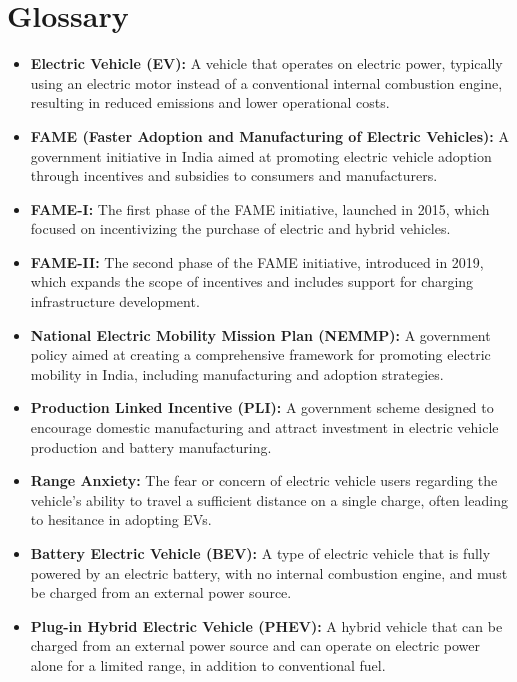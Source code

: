 \documentclass[a4paper,12pt]{report}
\begin{document}
\section{Glossary}
\begin{itemize}
    \item \textbf{Electric Vehicle (EV):} A vehicle that operates on electric power, typically using an electric motor instead of a conventional internal combustion engine, resulting in reduced emissions and lower operational costs.
    
    \item \textbf{FAME (Faster Adoption and Manufacturing of Electric Vehicles):} A government initiative in India aimed at promoting electric vehicle adoption through incentives and subsidies to consumers and manufacturers.
    
    \item \textbf{FAME-I:} The first phase of the FAME initiative, launched in 2015, which focused on incentivizing the purchase of electric and hybrid vehicles.
    
    \item \textbf{FAME-II:} The second phase of the FAME initiative, introduced in 2019, which expands the scope of incentives and includes support for charging infrastructure development.
    
    \item \textbf{National Electric Mobility Mission Plan (NEMMP):} A government policy aimed at creating a comprehensive framework for promoting electric mobility in India, including manufacturing and adoption strategies.
    
    \item \textbf{Production Linked Incentive (PLI):} A government scheme designed to encourage domestic manufacturing and attract investment in electric vehicle production and battery manufacturing.
    
    \item \textbf{Range Anxiety:} The fear or concern of electric vehicle users regarding the vehicle's ability to travel a sufficient distance on a single charge, often leading to hesitance in adopting EVs.
    
    \item \textbf{Battery Electric Vehicle (BEV):} A type of electric vehicle that is fully powered by an electric battery, with no internal combustion engine, and must be charged from an external power source.
    
    \item \textbf{Plug-in Hybrid Electric Vehicle (PHEV):} A hybrid vehicle that can be charged from an external power source and can operate on electric power alone for a limited range, in addition to conventional fuel.
    

\end{itemize}
\end{document}
